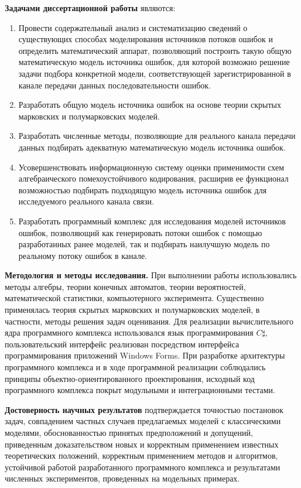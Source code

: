 \documentclass[twoside,12pt]{article}
\begin{document}
\textbf{Задачами диссертационной работы} являются:
 \begin{enumerate}
   \item {Провести содержательный анализ и систематизацию сведений о существующих способах моделирования источников потоков ошибок и определить математический аппарат, позволяющий построить такую общую математическую модель источника ошибок, для которой возможно решение задачи подбора конкретной модели, соответствующей зарегистрированной в канале передачи данных последовательности ошибок.}
   \item {Разработать общую модель источника ошибок на основе теории скрытых марковских и полумарковских моделей.}
   \item {Разработать численные методы, позволяющие для реального канала передачи данных подбирать адекватную математическую модель источника ошибок.}
   \item {Усовершенствовать информационную систему оценки применимости схем алгебраического помехоустойчивого кодирования, расширив ее функционал возможностью подбирать подходящую модель источника ошибок для исследуемого реального канала связи.}
   \item {Разработать программный комплекс для исследования моделей источников ошибок, позволяющий как генерировать потоки ошибок с помощью разработанных ранее моделей, так и подбирать наилучшую модель по реальному потоку ошибок в канале.}
 \end{enumerate}
 \textbf{Методология и методы исследования.} При выполнении работы использовались методы алгебры, теории конечных автоматов, теории вероятностей, математической статистики, компьютерного эксперимента. Существенно применялась теория скрытых марковских и полумарковских моделей, в частности, методы решения задач оценивания. Для реализации вычислительного ядра программного комплекса использовался язык программирования $C\sharp$, пользовательский интерфейс реализован посредством интерфейса программирования приложений Windows Forms. При разработке архитектуры программного комплекса и в ходе программной реализации соблюдались принципы объектно-ориентированного проектирования, исходный код программного комплекса покрыт модульными и интеграционными тестами.

\textbf{Достоверность научных результатов} подтверждается точностью постановок задач, совпадением частных случаев предлагаемых моделей с классическими моделями, обоснованностью принятых предположений и допущений, приведенным доказательством новых и корректным применением известных теоретических положений, корректным применением методов и алгоритмов, устойчивой работой разработанного программного комплекса и результатами численных экспериментов, проведенных на модельных примерах.
\end{document}
